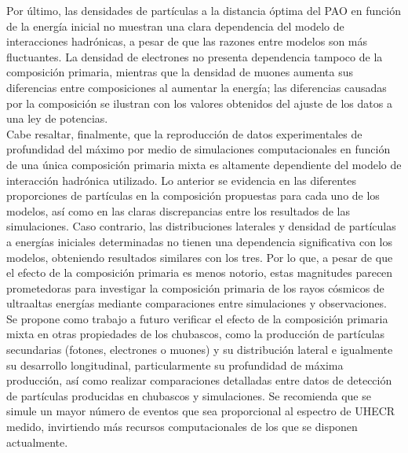 Por último, las densidades de partículas a la distancia óptima del PAO en función de la energía inicial no muestran una clara dependencia del modelo de interacciones hadrónicas, a pesar de que las razones entre modelos son más fluctuantes. La densidad de electrones no presenta dependencia tampoco de la composición primaria, mientras que la densidad de muones aumenta sus diferencias entre composiciones al aumentar la energía; las diferencias causadas por la composición se ilustran con los valores obtenidos del ajuste de los datos a una ley de potencias. \\

Cabe resaltar, finalmente, que la reproducción de datos experimentales de profundidad del máximo por medio de simulaciones computacionales en función de una única composición primaria mixta es altamente dependiente del modelo de interacción hadrónica utilizado. Lo anterior se evidencia en las diferentes proporciones de partículas en la composición propuestas para cada uno de los modelos, así como en las claras discrepancias entre los resultados de las simulaciones. Caso contrario, las distribuciones laterales y densidad de partículas a energías iniciales determinadas no tienen una dependencia significativa con los modelos, obteniendo resultados similares con los tres. Por lo que, a pesar de que el efecto de la composición primaria es menos notorio, estas magnitudes parecen prometedoras para investigar la composición primaria de los rayos cósmicos de ultraaltas energías mediante comparaciones entre simulaciones y observaciones. \\

Se propone como trabajo a futuro verificar el efecto de la composición primaria mixta en otras propiedades de los chubascos, como la producción de partículas secundarias (fotones, electrones o muones) y su distribución lateral e igualmente su desarrollo longitudinal, particularmente su profundidad de máxima producción, así como realizar comparaciones detalladas entre datos de detección de partículas producidas en chubascos y simulaciones. Se recomienda que se simule un mayor número de eventos que sea proporcional al espectro de UHECR medido, invirtiendo más recursos computacionales de los que se disponen actualmente.

\singlespacing
